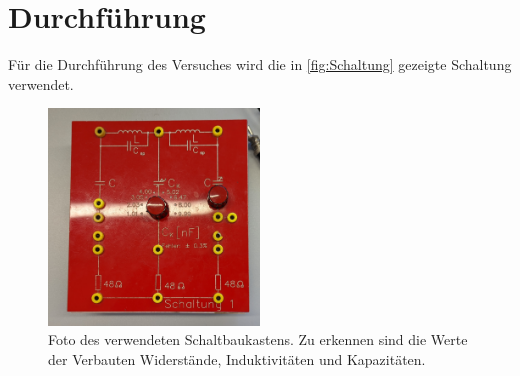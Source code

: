 \section{Durchführung}
\label{sec:Durchführung}
Für die Durchführung des Versuches wird die in \autoref{fig:Schaltung} gezeigte Schaltung verwendet. 
\begin{figure}
    \centering
    \caption{Foto des verwendeten Schaltbaukastens. Zu erkennen sind die Werte der Verbauten Widerstände, Induktivitäten und Kapazitäten.}
    \label{fig:Schaltung}
    \includegraphics[width=0.5\textwidth]{content/Schaltung.jpg}
\end{figure}

